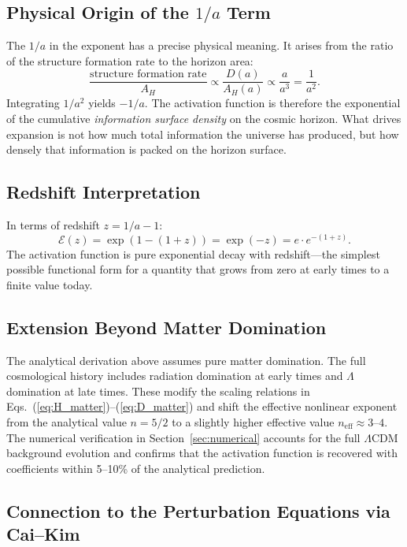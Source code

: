 \documentclass[11pt]{article}
\begin{document}
\subsection{Physical Origin of the $1/a$ Term}

The $1/a$ in the exponent has a precise physical meaning.  It arises from
the ratio of the structure formation rate to the horizon area:
\begin{equation}
\frac{\text{structure formation rate}}{A_H} \propto
\frac{D(a)}{A_H(a)} \propto \frac{a}{a^3} = \frac{1}{a^2}.
\end{equation}
Integrating $1/a^2$ yields $-1/a$.  The activation function is therefore
the exponential of the cumulative \textit{information surface density} on
the cosmic horizon.  What drives expansion is not how much total information
the universe has produced, but how densely that information is packed on the
horizon surface.

\subsection{Redshift Interpretation}

In terms of redshift $z = 1/a - 1$:
\begin{equation}
\mathcal{E}(z) = \exp(1 - (1+z)) = \exp(-z) = e\cdot e^{-(1+z)}.
\end{equation}
The activation function is pure exponential decay with redshift---the
simplest possible functional form for a quantity that grows from zero at
early times to a finite value today.

\subsection{Extension Beyond Matter Domination}

The analytical derivation above assumes pure matter domination.  The full
cosmological history includes radiation domination at early times and
$\Lambda$ domination at late times.  These modify the scaling relations in
Eqs.~(\ref{eq:H_matter})--(\ref{eq:D_matter}) and shift the effective
nonlinear exponent from the analytical value $n = 5/2$ to a slightly higher
effective value $n_\mathrm{eff} \approx 3$--$4$.  The numerical verification
in Section~\ref{sec:numerical} accounts for the full $\Lambda$CDM background
evolution and confirms that the activation function is recovered with
coefficients within 5--10\% of the analytical prediction.

\subsection{Connection to the Perturbation Equations via Cai--Kim}
\end{document}

